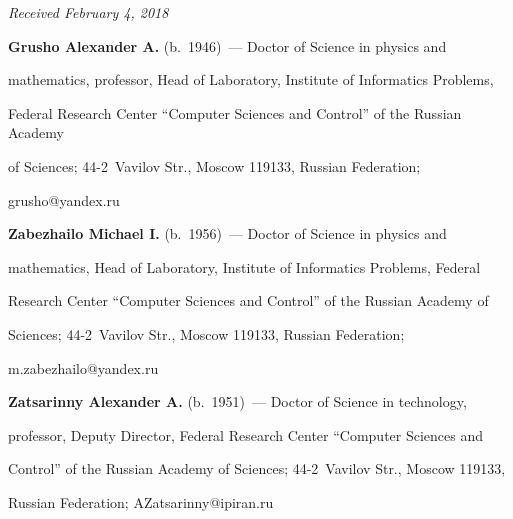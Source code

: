 \hfill{\small\textit{Received February 4, 2018}}   





\Contr





\noindent


\textbf{Grusho Alexander A.} (b.\ 1946)~--- Doctor of Science in physics and 


mathematics, professor, Head of Laboratory, Institute of Informatics Problems, 


Federal Research Center ``Computer Sciences and Control'' of the Russian Academy 


of Sciences; 44-2~Vavilov Str., Moscow 119133, Russian Federation;  


\mbox{grusho@yandex.ru} 





\vspace*{3pt}





\noindent


\textbf{Zabezhailo Michael I.} (b.\ 1956)~--- Doctor of Science in physics and 


mathematics, Head of Laboratory, Institute of Informatics Problems, Federal 


Research Center ``Computer Sciences and Control'' of the Russian Academy of 


Sciences; 44-2~Vavilov Str., Moscow 119133, Russian Federation; 


\mbox{m.zabezhailo@yandex.ru} 





\vspace*{3pt}





\noindent


\textbf{Zatsarinny Alexander A.} (b.\ 1951)~--- Doctor of Science in technology, 


professor, Deputy Director, Federal Research Center ``Computer Sciences and 


Control'' of the Russian Academy of Sciences; 44-2~Vavilov Str., Moscow 119133, 


Russian Federation; \mbox{AZatsarinny@ipiran.ru} 





